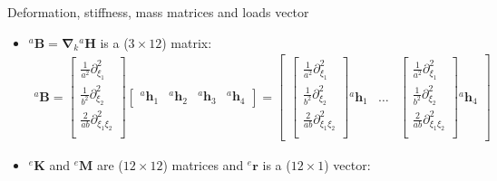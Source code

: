 \documentclass[aspectratio=169]{beamer}
\begin{document}
{\begin{frame}{Deformation, stiffness, mass matrices and loads vector}
  \begin{itemize}
    \item ${}^a\mathbf B=\boldsymbol\nabla_k{}^a\mathbf H$ is a ($3\times 12$) matrix:
          \begin{align*}
            {}^a\mathbf B
            =\begin{bmatrix}
               \frac{1}{a^2}\partial^2_{\xi_1}     \\[5pt]
               \frac{1}{b^2}\partial^2_{\xi_2}     \\[5pt]
               \frac{2}{ab}\partial^2_{\xi_1\xi_2} \\[5pt]
             \end{bmatrix}\begin{bmatrix}
                            {}^a \mathbf h_1 & {}^a\mathbf  h_2 & {}^a \mathbf h_3 & {}^a\mathbf  h_4
                          \end{bmatrix}=\left[
              \begin{array}{ccc}
                \begin{bmatrix}
                  \frac{1}{a^2}\partial^2_{\xi_1}     \\[5pt]
                  \frac{1}{b^2}\partial^2_{\xi_2}     \\[5pt]
                  \frac{2}{ab}\partial^2_{\xi_1\xi_2} \\[5pt]
                \end{bmatrix}{}^a \mathbf h_1 & \dots & \begin{bmatrix}
                                                          \frac{1}{a^2}\partial^2_{\xi_1}     \\[5pt]
                                                          \frac{1}{b^2}\partial^2_{\xi_2}     \\[5pt]
                                                          \frac{2}{ab}\partial^2_{\xi_1\xi_2} \\[5pt]
                                                        \end{bmatrix}{}^a \mathbf h_4
              \end{array} \right]
          \end{align*}
          \vspace{0.1cm}
    \item ${}^e\mathbf K$ and ${}^e\mathbf M$ are ($12\times 12$) matrices and ${}^e\mathbf r$ is a ($12\times 1$) vector:
          \begin{align*}

\end{align*}
\end{itemize}
\end{frame}}
\end{document}
